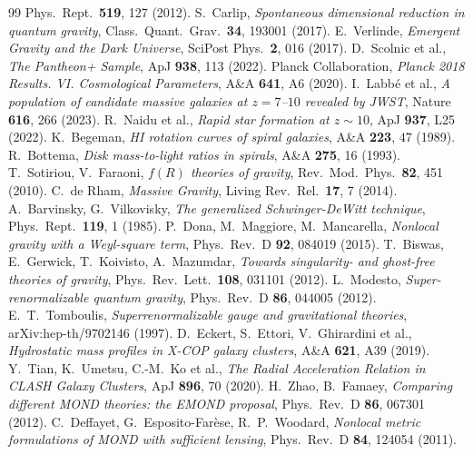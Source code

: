 \documentclass[11pt,a4paper]{article}
\begin{document}
\begin{onehalfspacing}
\begin{thebibliography}{99}
Phys.\ Rept.\ \textbf{519}, 127 (2012).
S.~Carlip,
\emph{Spontaneous dimensional reduction in quantum gravity},
Class.\ Quant.\ Grav.\ \textbf{34}, 193001 (2017).
E.~Verlinde,
\emph{Emergent Gravity and the Dark Universe},
SciPost Phys.\ \textbf{2}, 016 (2017).
D.~Scolnic et al.,
\emph{The Pantheon+ Sample},
ApJ \textbf{938}, 113 (2022).
Planck Collaboration,
\emph{Planck 2018 Results. VI. Cosmological Parameters},
A\&A \textbf{641}, A6 (2020).
I.~Labb{\'e} et al.,
\emph{A population of candidate massive galaxies at $z=7$--$10$ revealed by JWST},
Nature \textbf{616}, 266 (2023).
R.~Naidu et al.,
\emph{Rapid star formation at $z\sim10$},
ApJ \textbf{937}, L25 (2022).
K.~Begeman,
\emph{HI rotation curves of spiral galaxies},
A\&A \textbf{223}, 47 (1989).
R.~Bottema,
\emph{Disk mass-to-light ratios in spirals},
A\&A \textbf{275}, 16 (1993).
T.~Sotiriou, V.~Faraoni,
\emph{$f(R)$ theories of gravity},
Rev.\ Mod.\ Phys.\ \textbf{82}, 451 (2010).
C.~de Rham,
\emph{Massive Gravity},
Living Rev.\ Rel.\ \textbf{17}, 7 (2014).
A.~Barvinsky, G.~Vilkovisky,
\emph{The generalized Schwinger-DeWitt technique},
Phys.\ Rept.\ \textbf{119}, 1 (1985).
P.~Dona, M.~Maggiore, M.~Mancarella,
\emph{Nonlocal gravity with a Weyl-square term},
Phys.\ Rev.\ D \textbf{92}, 084019 (2015).
T.~Biswas, E.~Gerwick, T.~Koivisto, A.~Mazumdar,
\emph{Towards singularity- and ghost-free theories of gravity},
Phys.\ Rev.\ Lett.\ \textbf{108}, 031101 (2012).
L.~Modesto,
\emph{Super-renormalizable quantum gravity},
Phys.\ Rev.\ D \textbf{86}, 044005 (2012).
E.~T.~Tomboulis,
\emph{Superrenormalizable gauge and gravitational theories},
arXiv:hep-th/9702146 (1997).
D.~Eckert, S.~Ettori, V.~Ghirardini et al.,
\emph{Hydrostatic mass profiles in X-COP galaxy clusters},
A\&A \textbf{621}, A39 (2019).
Y.~Tian, K.~Umetsu, C.-M.~Ko et al.,
\emph{The Radial Acceleration Relation in CLASH Galaxy Clusters},
ApJ \textbf{896}, 70 (2020).
H.~Zhao, B.~Famaey,
\emph{Comparing different MOND theories: the EMOND proposal},
Phys.\ Rev.\ D \textbf{86}, 067301 (2012).
C.~Deffayet, G.~Esposito-Far\`ese, R.~P.~Woodard,
\emph{Nonlocal metric formulations of MOND with sufficient lensing},
Phys.\ Rev.\ D \textbf{84}, 124054 (2011).
\end{thebibliography}
\newpage
\appendix

\end{onehalfspacing}
\end{document}
